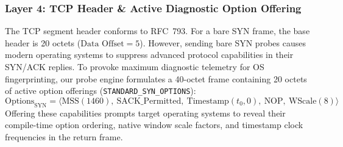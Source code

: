 \subsubsection{Layer 4: TCP Header \& Active Diagnostic Option Offering}
The TCP segment header conforms to RFC~793. For a bare SYN frame, the base header is 20 octets
($\text{Data Offset} = 5$). However, sending bare SYN probes causes modern operating systems to
suppress advanced protocol capabilities in their SYN/ACK replies. To provoke maximum diagnostic
telemetry for OS fingerprinting, our probe engine formulates a 40-octet frame containing 20
octets of active option offerings (\texttt{STANDARD\_SYN\_OPTIONS}):
\begin{equation}
\text{Options}_{\text{SYN}} = \langle \text{MSS}(1460), \ \text{SACK\_Permitted}, \ \text{Timestamp}(t_0, 0), \ \text{NOP}, \ \text{WScale}(8) \rangle
\end{equation}
Offering these capabilities prompts target operating systems to reveal their compile-time option
ordering, native window scale factors, and timestamp clock frequencies in the return frame.

